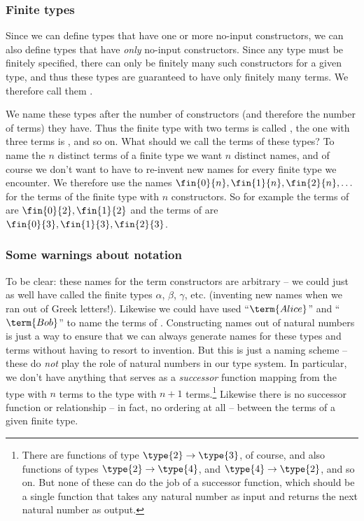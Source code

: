 \subsubsection{Finite types}

Since we can define types that have one or more no-input constructors, we can also define types that have \emph{only} no-input constructors.  Since any type must be finitely specified, there can only be finitely many such constructors for a given type, and thus these types are guaranteed to have only finitely many terms.  We therefore call them .

We name these types after the number of constructors (and therefore the number of terms) they have.  Thus the finite type with two terms is called , the one with three terms is , and so on.  What should we call the terms of these types?  To name the $n$ distinct terms of a finite type we want $n$ distinct names, and of course we don't want to have to re-invent new names for every finite type we encounter.  We therefore use the names $\fin{0}{n}, \fin{1}{n}, \fin{2}{n}, \ldots$ for the terms of the finite type with $n$ constructors.  So for example the terms of  are 
$\fin{0}{2}, \fin{1}{2}$ and the
terms of  are 
$\fin{0}{3}, \fin{1}{3}, \fin{2}{3}$.


\subsubsection{Some warnings about notation}


To be clear: these names for the term constructors are arbitrary -- we could just as well have called the finite types $\alpha$, $\beta$, $\gamma$, etc. (inventing new names when we ran out of Greek letters!).  Likewise we could have used
``$\term{Alice}$''
and
``$\term{Bob}$'' to name 
the terms of .  Constructing names out of natural numbers is just a way to ensure that we can always generate names for these types and terms without having to resort to invention.  But this is just a naming scheme -- these do \emph{not} play the role of natural numbers in our type system.  In particular, we don't have anything that serves as a \emph{successor} function mapping from the type with $n$ terms to the type with $n+1$ terms.\footnote{
There are functions of type $\type{2} \to \type{3}$, of course, and also functions of types $\type{2} \to \type{4}$, and $\type{4} \to \type{2}$, and so on.  But none of these can do the job of a successor function, which should be a single function that takes any natural number as input and returns the next natural number as output.
}  Likewise there is no successor function or relationship -- in fact, no ordering at all -- between the terms of a given finite type.

